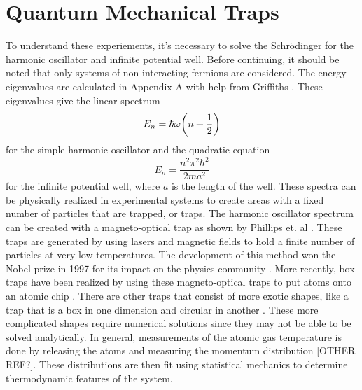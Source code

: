 \section{Quantum Mechanical Traps}
To understand these experiements, it's necessary to solve the Schr\"odinger for the harmonic oscillator and infinite potential well. Before continuing, it should be noted that only systems of non-interacting fermions are considered. The energy eigenvalues are calculated in Appendix A with help from Griffiths \cite{Griffiths}. These eigenvalues give the linear spectrum 
\begin{equation}
    E_n=\hbar\omega\qty(n+\frac{1}{2})
\end{equation}
for the simple harmonic oscillator and the quadratic equation 
\begin{equation}
    E_n=\frac{n^2\pi^2\hbar^2}{2ma^2}
\end{equation}
for the infinite potential well, where $a$ is the length of the well. These spectra can be physically realized in experimental systems to create areas with a fixed number of particles that are trapped, or traps. The harmonic oscillator spectrum can be created with a magneto-optical trap as shown by Phillips et. al \cite{Phillips_1998}. These traps are generated by using lasers and magnetic fields to hold a finite number of particles at very low temperatures. The development of this method won the Nobel prize in 1997 for its impact on the physics community \cite{nobelprize.org_1997}. More recently, box traps have been realized by using these magneto-optical traps to put atoms onto an atomic chip \cite{Es2010}. There are other traps that consist of more exotic shapes, like a trap that is a box in one dimension and circular in another \cite{Mukherjee2017}. These more complicated shapes require numerical solutions since they may not be able to be solved analytically. In general, measurements of the atomic gas temperature is done by releasing the atoms and measuring the momentum distribution \cite{Es2010}[OTHER REF?]. These distributions are then fit using statistical mechanics to determine thermodynamic features of the system. 

